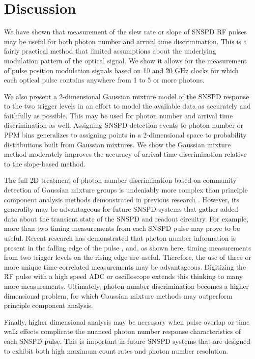 \documentclass[11pt]{caltech_thesis} %
\begin{document}
\hypertarget{discussion}{%
\section{Discussion}\label{discussion}}

We have shown that measurement of the slew rate or slope of SNSPD RF pulses may be useful for both photon number and arrival time discrimination. This is a fairly practical method that limited assumptions about the underlying modulation pattern of the optical signal. We show it allows for the measurement of pulse position modulation signals based on 10 and 20 GHz clocks for which each optical pulse contains anywhere from 1 to 5 or more photons.

We also present a 2-dimensional Gaussian mixture model of the SNSPD response to the two trigger levels in an effort to model the available data as accurately and faithfully as possible. This may be used for photon number and arrival time discrimination as well. Assigning SNSPD detection events to photon number or PPM bins generalizes to assigning points in a 2-dimensional space to probability distributions built from Gaussian mixtures. We show the Gaussian mixture method moderately improves the accuracy of arrival time discrimination relative to the slope-based method.

The full 2D treatment of photon number discrimination based on community detection of Gaussian mixture groups is undeniably more complex than principle component analysis methods demonstrated in previous research \autocite{sauer2023resolving,schapeler2023superconducting}. However, its generality may be advantageous for future SNSPD systems that gather added data about the transient state of the SNSPD and readout circuitry. For example, more than two timing measurements from each SNSPD pulse may prove to be useful. Recent research has demonstrated that photon number information is present in the falling edge of the pulse \autocite{sauer2023resolving,schapeler2023superconducting}, and, as shown here, timing measurements from two trigger levels on the rising edge are useful. Therefore, the use of three or more unique time-correlated measurements may be advantageous. Digitizing the RF pulse with a high speed ADC or oscilloscope extends this thinking to many more measurements. Ultimately, photon number discrimination becomes a higher dimensional problem, for which Gaussian mixture methods may outperform principle component analysis.

Finally, higher dimensional analysis may be necessary when pulse overlap or time walk effects \autocite{Mueller2023} complicate the nuanced photon number response characteristics of each SNSPD pulse. This is important in future SNSPD systems that are designed to exhibit both high maximum count rates \autocite{Craiciu23} and photon number resolution.
\end{document}
